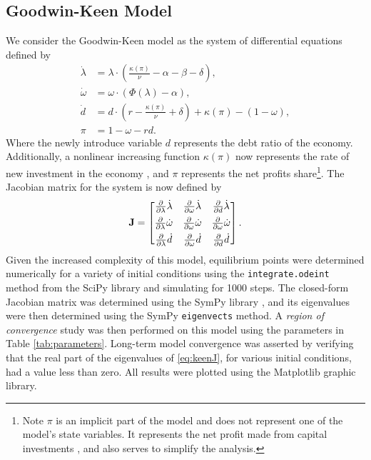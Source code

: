 \documentclass[12pt, centerh1]{article}
\begin{document}
\subsection{Goodwin-Keen Model}
We consider the Goodwin-Keen model as the system of differential equations defined by 
\begin{equation} \label{eq:keen}
\begin{split}
    \dot{\lambda} &= \lambda \cdot \left( \frac{\kappa(\pi)}{\nu} - \alpha - \beta - \delta \right),\\
    \dot{\omega} &= \omega \cdot (\Phi(\lambda) - \alpha),\\
    \dot{d} &= d\cdot\left(r-\frac{\kappa(\pi)}{\nu}+\delta\right)+\kappa(\pi)-(1-\omega), \\
    \pi &= 1-\omega-rd.
\end{split}
\end{equation}
Where the newly introduce variable $d$ represents the debt ratio of the economy. Additionally, a nonlinear increasing function $\kappa(\pi)$ now represents the rate of new investment in the economy \citep{grasselli2012analysis}, and $\pi$ represents the net profits share\footnote{Note $\pi$ is an implicit part of the model and does not represent one of the model's state variables. It represents the net profit made from capital investments \citep{grasselli2012analysis}, and also serves to simplify the analysis.}. The Jacobian matrix for the system is now defined by 
\begin{equation} \label{eq:keenJ}
\mathbf J =
\begin{bmatrix}
    \pdv{\lambda}\dot{\lambda} & \pdv{\omega}\dot{\lambda} & \pdv{d}\dot{\lambda}\\[1ex]
    \pdv{\lambda}\dot{\omega} & \pdv{\omega}\dot{\omega} & \pdv{\omega}\dot{\omega}\\[1ex]
    \pdv{\lambda}\dot{d} & \pdv{\omega}\dot{d} & \pdv{d}\dot{d}
\end{bmatrix}.
\end{equation}
Given the increased complexity of this model, equilibrium points were determined numerically for a variety of initial conditions using the \texttt{integrate.odeint} method from the SciPy library \citep{2020SciPy-NMeth} and simulating for 1000 steps. The closed-form Jacobian matrix was determined using the SymPy library \citep{SymPy}, and its eigenvalues were then determined using the SymPy \texttt{eigenvects} method. A \emph{region of convergence} study was then performed on this model using the parameters in Table \ref{tab:parameters}. Long-term model convergence was asserted by verifying that the real part of the eigenvalues of \eqref{eq:keenJ}, for various initial conditions, had a value less than zero. All results were plotted using the Matplotlib \citep{matplotlib} graphic library.
\end{document}
